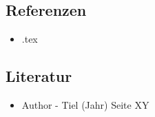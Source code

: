 \documentclass{sajzk}
\begin{document}
\section{}
\label{}
\lhead{}


\subsection{Referenzen}
\begin{itemize}
    \item \nameref{} .tex
\end{itemize}

\subsection{Literatur}
\begin{itemize}
    \item Author - Tiel (Jahr) Seite XY
\end{itemize}
\end{document}
